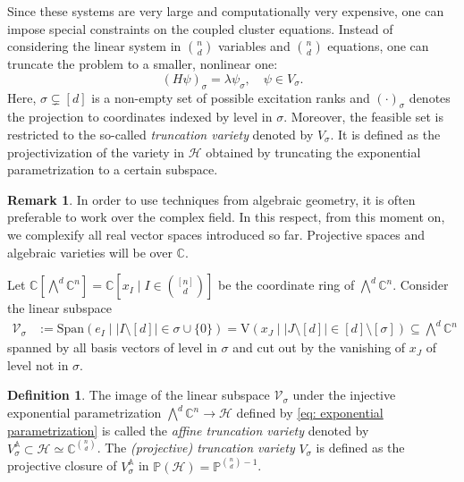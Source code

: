 \documentclass[11pt,reqno]{amsart}
\theoremstyle{definition}
\newtheorem{definition}[theorem]{Definition}
\newtheorem{remark}[theorem]{Remark}
\numberwithin{theorem}{section}
\numberwithin{equation}{section}
\begin{document}
Since these systems are very large and computationally very expensive, one can impose special constraints on the coupled cluster equations. Instead of considering the linear system in ${n \choose d}$ variables and ${n \choose d}$ equations, one can truncate the problem to a smaller, nonlinear one:
\begin{equation}\label{eq:truncatedproblem}
   (H \psi)_{\sigma} = \lambda \psi_{\sigma}, \quad \psi \in V_{\sigma}. 
\end{equation}
Here, $\sigma \subsetneq [d]$ is a non-empty set of possible excitation ranks and $(\cdot)_{\sigma}$ denotes the projection to coordinates indexed by level in $\sigma$. Moreover, the feasible set is restricted to the so-called \emph{truncation variety} denoted by $V_{\sigma}$. It is defined as the projectivization of the variety in $\mathcal H$ obtained by truncating the exponential parametrization to a certain subspace.

\begin{remark}
In order to use techniques from algebraic geometry, it is often preferable to work over the complex field. In this respect, from this moment on, we complexify all real vector spaces introduced so far. Projective spaces and algebraic varieties will be over $\mathbb{C}$.
\end{remark}

Let $\mathbb C[ \bigwedge^d\mathbb C^n]=\mathbb C[x_I \mid I \in \binom{[n]}{d}]$ be the coordinate ring of $\bigwedge^d \mathbb C^n$. Consider the linear subspace 
\begin{align*}
\mathcal V_{\sigma} & := \textrm{Span}( e_I \mid |I \setminus [d]| \in \sigma \cup \{0\} ) = \textrm{V}(x_J \mid |J \setminus [d] | \in [d] \setminus [\sigma]) \subseteq \bigwedge^d \mathbb C^n
\end{align*}
spanned by all basis vectors of level in $\sigma$ and cut out by the vanishing of $x_J$ of level not in $\sigma$.

\begin{definition}
 The image of the linear subspace $\mathcal V_{\sigma}$ under the injective exponential parametrization $\bigwedge^d\mathbb C^n \rightarrow \mathcal{H}$ defined by \eqref{eq: exponential parametrization} is called the \emph{affine truncation variety} denoted by { $V_{\sigma}^{\mathbb A} \subset \mathcal H \simeq \mathbb C^{n \choose d}$}. The \emph{(projective) truncation variety} $V_{\sigma}$ is defined as the projective closure of $V_{\sigma}^{\mathbb A}$ in {$\mathbb P(\mathcal H) = \mathbb P^{{n \choose d}-1}$}.
\end{definition}
\end{document}
